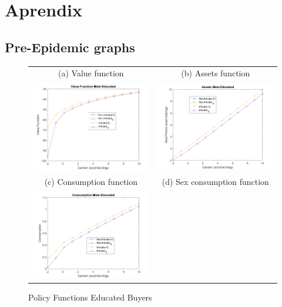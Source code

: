 \section{Aprendix}
\subsection{Pre-Epidemic graphs}
\begin{figure}[H]
\caption{Policy Functions Educated Buyers}
\hspace{-2.0cm}
\begin{center}
\begin{tabular}{cc}
\multicolumn{1}{c}{(a) Value function} &  
\multicolumn{1}{c}{(b) Assets function} \\
\includegraphics[angle=0,width=.5\textwidth]{figures/FIG1.png}   & 
\includegraphics[angle=0,width=.5\textwidth]{figures/FIG3.png} \\
\multicolumn{1}{c}{(c) Consumption function} &  
\multicolumn{1}{c}{(d) Sex consumption function } \\
\includegraphics[angle=0,width=.5\textwidth]{figures/FIG2.png}   & 

\end{tabular}
\end{center}
\end{figure}
